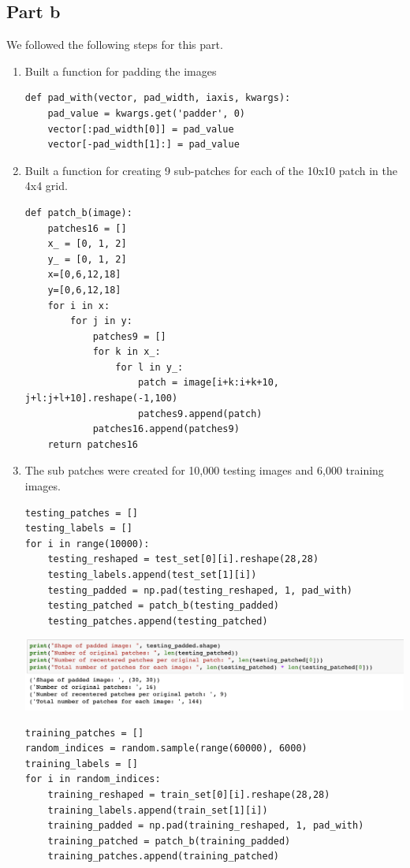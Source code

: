 \documentclass{article}      %
\begin{document}
\subsection{Part b}

We followed the following steps for this part.

\begin{enumerate}[label=(\alph*)]
\item Built a function for padding the images

\begin{lstlisting}
def pad_with(vector, pad_width, iaxis, kwargs):
    pad_value = kwargs.get('padder', 0)
    vector[:pad_width[0]] = pad_value
    vector[-pad_width[1]:] = pad_value
\end{lstlisting}

\item Built a function for creating 9 sub-patches for each of the 10x10 patch in the 4x4 grid.
\begin{lstlisting}
def patch_b(image):
    patches16 = []
    x_ = [0, 1, 2]
    y_ = [0, 1, 2]
    x=[0,6,12,18]
    y=[0,6,12,18]
    for i in x:
        for j in y:
            patches9 = []
            for k in x_:
                for l in y_:
                    patch = image[i+k:i+k+10, j+l:j+l+10].reshape(-1,100)
                    patches9.append(patch)
            patches16.append(patches9)
    return patches16
\end{lstlisting}

\item The sub patches were created for 10,000 testing images and 6,000 training images.

\begin{lstlisting}
testing_patches = []
testing_labels = []
for i in range(10000):
    testing_reshaped = test_set[0][i].reshape(28,28)
    testing_labels.append(test_set[1][i])
    testing_padded = np.pad(testing_reshaped, 1, pad_with)
    testing_patched = patch_b(testing_padded)
    testing_patches.append(testing_patched)
\end{lstlisting}

\includegraphics[width=\textwidth]{testpad}

\begin{lstlisting}
training_patches = []
random_indices = random.sample(range(60000), 6000)
training_labels = []
for i in random_indices:
    training_reshaped = train_set[0][i].reshape(28,28)
    training_labels.append(train_set[1][i])
    training_padded = np.pad(training_reshaped, 1, pad_with)
    training_patched = patch_b(training_padded)
    training_patches.append(training_patched)
\end{lstlisting}


\end{enumerate}
\end{document}
